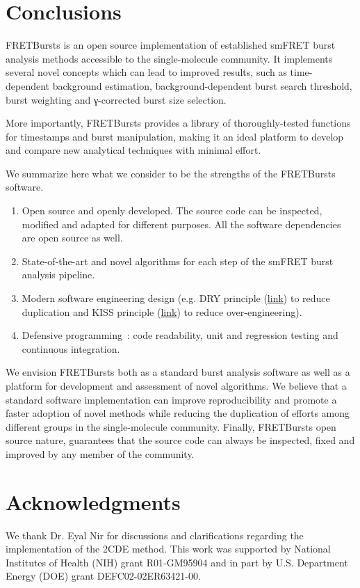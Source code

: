 \section{Conclusions}
\label{sec:conclusions}

FRETBursts is an open source implementation of established smFRET burst analysis methods
accessible to the single-molecule community.
It implements several novel concepts which can lead
to improved results, such as
time-dependent background estimation, background-dependent burst search threshold,
burst weighting and  γ-corrected burst size selection.

More importantly, FRETBursts provides a library of thoroughly-tested functions
for timestamps and burst manipulation, making it an ideal platform to
develop and compare new analytical techniques with minimal effort.

We summarize here what we consider to be the strengths
of the FRETBursts software.

\begin{enumerate}
\item Open source and openly developed. The source code can be inspected, modified and
adapted for different purposes. All the software dependencies are open source as well.
\item State-of-the-art and novel algorithms for each step of the
smFRET burst analysis pipeline.
\item Modern software engineering design (e.g. DRY principle
(\href{http://en.wikipedia.org/wiki/Don\%27t_repeat_yourself}{link})
to reduce duplication and KISS principle
(\href{http://en.wikipedia.org/wiki/KISS_principle}{link})
to reduce over-engineering).
\item Defensive programming~\cite{Prli__2012}: code readability,
unit and regression testing and continuous integration.
\end{enumerate}

We envision FRETBursts both as a standard burst analysis
software as well as a platform for development and assessment of novel algorithms.
We believe that a standard software implementation can improve
reproducibility and promote a faster adoption of novel methods 
while reducing the duplication of efforts among different groups
in the single-molecule community.
Finally, FRETBursts open source nature, guarantees that the source code
can always be inspected, fixed and improved
by any member of the community.


\section*{Acknowledgments}
We thank Dr. Eyal Nir for discussions and clarifications regarding the 
implementation of the 2CDE method.
This work was supported by National Institutes of Health (NIH)
grant R01-GM95904 and in part by U.S. Department Energy (DOE) grant DEFC02-02ER63421-00.
